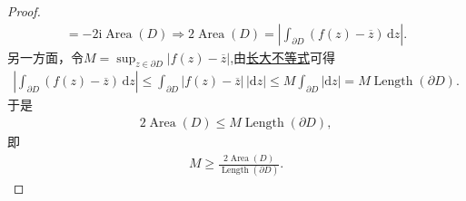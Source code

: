 \documentclass[../../main.tex]{subfiles}%
\begin{document}
\begin{proof}
\begin{align*}
= -2\mathrm{i} \operatorname{Area}(D)\Longrightarrow 2 \operatorname{Area}(D)
= \left| \int_{\partial D} (f(z) - \overline{z}) \, \mathrm{d}z \right|.
\end{align*}
另一方面，令$M = \sup_{z \in \partial D} |f(z) - \overline{z}|$,由\hyperref[theorem:长大不等式]{长大不等式}可得
\begin{align*}
\left| \int_{\partial D} (f(z) - \overline{z}) \, \mathrm{d}z \right|
\leqslant \int_{\partial D} |f(z) - \overline{z}| \, |\mathrm{d}z|
\leqslant M \int_{\partial D} |\mathrm{d}z|
= M \operatorname{Length}(\partial D).
\end{align*}
于是
\begin{align*}
2 \operatorname{Area}(D) \leqslant M \operatorname{Length}(\partial D),
\end{align*}
即
\begin{align*}
M \geqslant \frac{2 \operatorname{Area}(D)}{\operatorname{Length}(\partial D)}.
\end{align*}
\end{proof}
\end{document}
